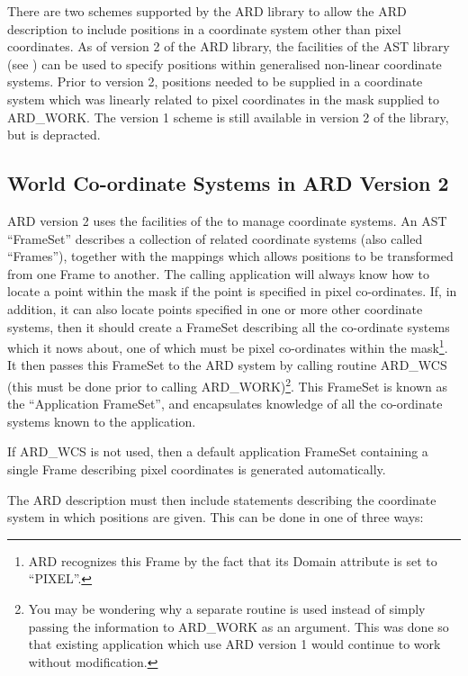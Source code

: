 There are two schemes supported by the ARD library to allow the ARD 
description to include positions in a coordinate system other than pixel 
coordinates. As of version 2 of the ARD library, the facilities of the
AST library (see ) can be used to specify
positions within generalised non-linear coordinate systems. Prior to 
version 2, positions needed to be supplied in a coordinate system which
was linearly related to pixel coordinates in the mask supplied to
ARD\_WORK. The version 1 scheme is still available in version 2 of the
library, but is depracted.

\subsection{World Co-ordinate Systems in ARD Version 2}

ARD version 2 uses the facilities of the  to
manage coordinate systems. An AST ``FrameSet'' describes a collection of
related coordinate systems (also called ``Frames''), together with the
mappings which allows positions to be transformed from one Frame to
another. The calling application will always know how to locate a point
within the mask if the point is specified in pixel co-ordinates. If, in
addition, it can also locate points specified in one or more other
coordinate systems, then it should create a FrameSet describing all the
co-ordinate systems which it nows about, one of which must be pixel
co-ordinates within the mask\footnote{ARD recognizes this Frame by the
fact that its Domain attribute is set to ``PIXEL''.}. It then passes this
FrameSet to the ARD system by calling routine ARD\_WCS (this must be done
prior to calling ARD\_WORK)\footnote{You may be wondering why a separate
routine is used instead of simply passing the information to ARD\_WORK as
an argument. This was done so that existing application which use ARD
version 1 would continue to work without modification.}. This FrameSet is
known as the ``Application FrameSet'', and encapsulates knowledge of all
the co-ordinate systems known to the application. 

If ARD\_WCS is not used, then a default application FrameSet containing a
single Frame describing pixel coordinates is generated automatically.

The ARD description must then include statements describing the 
coordinate system in which positions are given. This can be done in one
of three ways:

